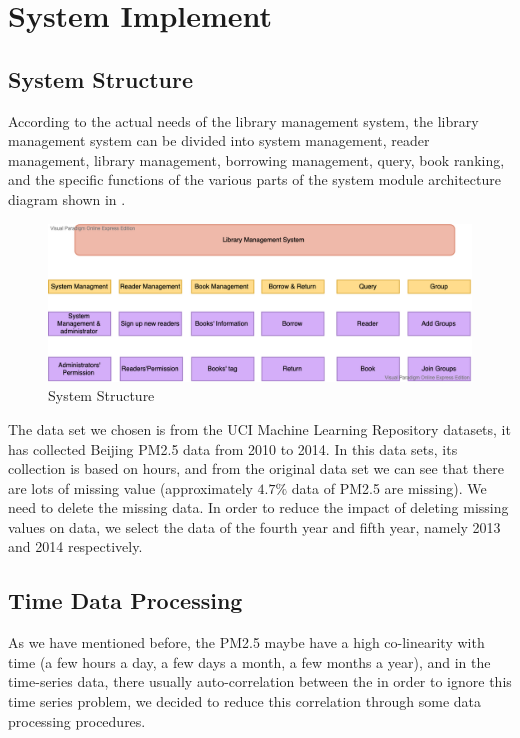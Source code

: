 
\chapter{System Implement} %

\label{Chapter2} %

\section{System Structure}

According to the actual needs of the library management system, the library management system can be divided into system management, reader management, library management, borrowing management, query, book ranking, and the specific functions of the various parts of the system module architecture diagram shown in  .

\begin{figure}[htbp!]
\centering
\includegraphics[width=1.0\textwidth]{Figures/structure.png}
\caption[Figures/origindata.png]{System Structure}
\label{fig:System Structure}
\end{figure}


The data set we chosen is from the UCI Machine Learning Repository datasets, it has collected Beijing PM2.5 data from 2010 to 2014. In this data sets, its collection is based on hours, and from the original data set we can see that there are lots of missing value (approximately $4.7\%$ data of PM2.5 are missing). We need to delete the missing data. In order to reduce the impact of deleting missing values on data, we select the data of the fourth year and fifth year, namely 2013 and 2014 respectively.


\section{Time Data Processing}
As we have mentioned before, the PM2.5 maybe have a high co-linearity with time (a few hours a day, a few days a month, a few months a year), and in the time-series data, there usually auto-correlation between the  in order to ignore this time series problem, we decided to reduce this correlation through some data processing procedures.

